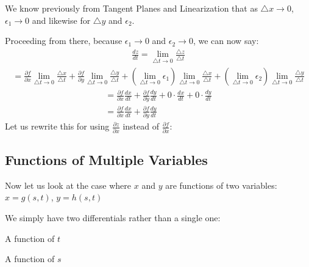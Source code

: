 \documentclass[12pt]{article}
\begin{document}
We know previously from Tangent Planes and Linearization that as \(\triangle x \to 0 \), \(\epsilon_1 \to 0\) and likewise for \(\triangle y\) and \(\epsilon_2\).

Proceeding from there, because \(\epsilon_1 \rightarrow 0\) and \(\epsilon_2 \rightarrow 0\), we can now say:
\begin{align}
	\frac{dz}{dt}=\lim_{\triangle t \to 0} \frac{\triangle z}{\triangle t}
\end{align}
\begin{align}
	= \frac{\partial f}{\partial x} \lim_{\triangle t \to 0} \frac{\triangle x}{\triangle t} + \frac{\partial f}{\partial y} \lim_{\triangle t \to 0} \frac{\triangle y}{\triangle t} + (\lim_{\triangle t \to 0} \epsilon_1)\lim_{\triangle t \to 0} \frac{\triangle x}{\triangle t} + (\lim_{\triangle t \to 0} \epsilon_2) \lim_{\triangle t \to 0} \frac{\triangle y}{\triangle t}
\end{align}
\begin{align}
	= \frac{\partial f}{\partial x} \frac{dx}{dt} + \frac{\partial f}{\partial y} \frac{dy}{dt}+ 0 \cdot \frac{dx}{dt}+0\cdot \frac{dy}{dt}\\
	=\frac{\partial f}{\partial x} \frac{dx}{dt}+ \frac{\partial f}{\partial y} \frac{dy}{dt}
\end{align}
Let us rewrite this for using \(\frac{\partial z}{\partial x} \) instead of \(\frac{\partial f}{\partial x} \):

\fbox{
	\begin{minipage}{1.6in}
		\[
			\frac{dz}{dt} = \frac{\partial z}{\partial x} \frac{dx}{dt} + \frac{\partial z}{\partial y} \frac{dy}{dt}
		\]
	\end{minipage}
}

\subsection{Functions of Multiple Variables}
Now let us look at the case where \(x\) and \(y\) are functions of two variables: \(x = g(s,t)\), \(y=h(s,t)\)

We simply have two differentials rather than a single one:

\noindent\fbox{%
	\begin{minipage}{1.6in}
		\[
			\frac{\partial z}{\partial s} = \frac{\partial f}{\partial x} \frac{dx}{ds}+ \frac{\partial f}{\partial y} \frac{dy}{ds}
		\]
	\end{minipage}	
}
A function of \(t\) 

\noindent\fbox{%
	\begin{minipage}{1.6in}
		\[
			\frac{\partial z}{\partial t} = \frac{\partial f}{\partial x} \frac{dx}{dt}+ \frac{\partial f}{\partial y} \frac{dy}{dt}
		\]
	\end{minipage}	
}
A function of \(s\)
\end{document}
